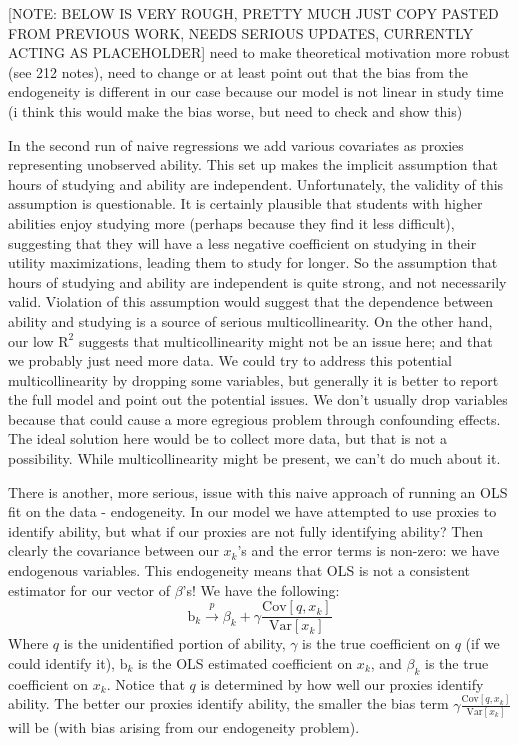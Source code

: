 \documentclass[12pt]{article}
\begin{document}
\textcolor{BrickRed}{[NOTE: BELOW IS VERY ROUGH, PRETTY MUCH JUST COPY PASTED FROM PREVIOUS WORK, NEEDS SERIOUS UPDATES, CURRENTLY ACTING AS PLACEHOLDER]} need to make theoretical motivation more robust (see 212 notes), need to change or at least point out that the bias from the endogeneity is different in our case because our model is not linear in study time (i think this would make the bias worse, but need to check and show this)

In the second run of naive regressions we add various covariates as proxies representing unobserved ability. This set up makes the implicit assumption that hours of studying and ability are independent. Unfortunately, the validity of this assumption is questionable. It is certainly plausible that students with higher abilities enjoy studying more (perhaps because they find it less difficult), suggesting that they will have a less negative coefficient on studying in their utility maximizations, leading them to study for longer. So the assumption that hours of studying and ability are independent is quite strong, and not necessarily valid. Violation of this assumption would suggest that the dependence between ability and studying is a source of serious multicollinearity. On the other hand, our low $\mathrm{R}^2$ suggests that multicollinearity might not be an issue here; and that we probably just need more data. We could try to address this potential multicollinearity by dropping some variables, but generally it is better to report the full model and point out the potential issues. We don't usually drop variables because that could cause a more egregious problem through confounding effects. The ideal solution here would be to collect more data, but that is not a possibility. While multicollinearity might be present, we can't do much about it.

There is another, more serious, issue with this naive approach of running an OLS fit on the data - endogeneity. In our model we have attempted to use proxies to identify ability, but what if our proxies are not fully identifying ability?  Then clearly the covariance between our $x_k$'s and the error terms is non-zero: we have endogenous variables. This endogeneity means that OLS is not a consistent estimator for our vector of $\beta$'s! We have the following:
$$
\mathrm{b}_k \stackrel{p}{\longrightarrow} \beta_k + \gamma \frac{\mathrm{Cov}[q, x_k]}{\mathrm{Var}[x_k]}
$$
Where $q$ is the unidentified portion of ability, $\gamma$ is the true coefficient on $q$ (if we could identify it), $\mathrm{b}_k$ is the OLS estimated coefficient on $x_k$, and $\beta_k$ is the true coefficient on $x_k$. Notice that $q$ is determined by how well our proxies identify ability. The better our proxies identify ability, the smaller the bias term $\gamma \frac{\mathrm{Cov}[q, x_k]}{\mathrm{Var}[x_k]}$ will be (with bias arising from our endogeneity problem).
\end{document}
